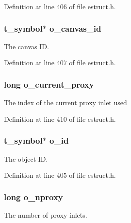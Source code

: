 Definition at line 406 of file estruct.\-h.

\hypertarget{struct__eobj_ab7f7ce6beaff87d1baca1a619b9a7ebf}{
\subsubsection[{o\-\_\-canvas\-\_\-id}]{\setlength{\rightskip}{0pt plus 5cm}t\-\_\-symbol$\ast$ o\-\_\-canvas\-\_\-id}}\label{struct__eobj_ab7f7ce6beaff87d1baca1a619b9a7ebf}
The canvas I\-D. 

Definition at line 407 of file estruct.\-h.

\hypertarget{struct__eobj_a32a8921c66d63fcccc9df035f6b9160f}{
\subsubsection[{o\-\_\-current\-\_\-proxy}]{\setlength{\rightskip}{0pt plus 5cm}long o\-\_\-current\-\_\-proxy}}\label{struct__eobj_a32a8921c66d63fcccc9df035f6b9160f}
The index of the current proxy inlet used 

Definition at line 410 of file estruct.\-h.

\hypertarget{struct__eobj_a024c5a2d6d2dcdf531f05a0e711cce68}{
\subsubsection[{o\-\_\-id}]{\setlength{\rightskip}{0pt plus 5cm}t\-\_\-symbol$\ast$ o\-\_\-id}}\label{struct__eobj_a024c5a2d6d2dcdf531f05a0e711cce68}
The object I\-D. 

Definition at line 405 of file estruct.\-h.

\hypertarget{struct__eobj_a5959b8f1e0726d2a7d82a4d39ae803bb}{
\subsubsection[{o\-\_\-nproxy}]{\setlength{\rightskip}{0pt plus 5cm}long o\-\_\-nproxy}}\label{struct__eobj_a5959b8f1e0726d2a7d82a4d39ae803bb}
The number of proxy inlets. 

